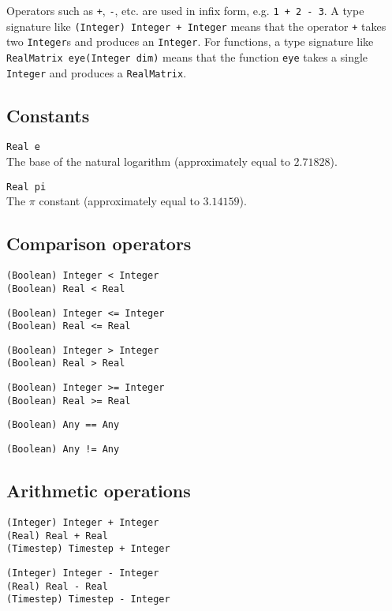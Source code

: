 Operators such as \verb|+|, \verb|-|, etc. are used in infix form, e.g. {\tt 1
+ 2 - 3}. A type signature like \verb|(Integer) Integer + Integer| means that
the operator \verb|+| takes two \verb|Integer|s and produces an \verb|Integer|.
For functions, a type signature like \verb|RealMatrix eye(Integer dim)| means
that the function \verb|eye| takes a single \verb|Integer| and produces a
\verb|RealMatrix|.


\subsection{Constants}
\label{sec:builtin-constants}

\verb|Real e| \\
The base of the natural logarithm (approximately equal to $2.71828$).

\verb|Real pi| \\
The $\pi$ constant (approximately equal to $3.14159$).


\subsection{Comparison operators}
\label{sec:builtin-comparison}

\verb|(Boolean) Integer < Integer| \\
\verb|(Boolean) Real < Real|

\verb|(Boolean) Integer <= Integer| \\
\verb|(Boolean) Real <= Real|

\verb|(Boolean) Integer > Integer| \\
\verb|(Boolean) Real > Real|

\verb|(Boolean) Integer >= Integer| \\
\verb|(Boolean) Real >= Real|

\verb|(Boolean) Any == Any|

\verb|(Boolean) Any != Any|


\subsection{Arithmetic operations}
\label{sec:builtin-arithmetic}

\verb|(Integer) Integer + Integer| \\
\verb|(Real) Real + Real| \\
\verb|(Timestep) Timestep + Integer|

\verb|(Integer) Integer - Integer| \\
\verb|(Real) Real - Real| \\
\verb|(Timestep) Timestep - Integer|

